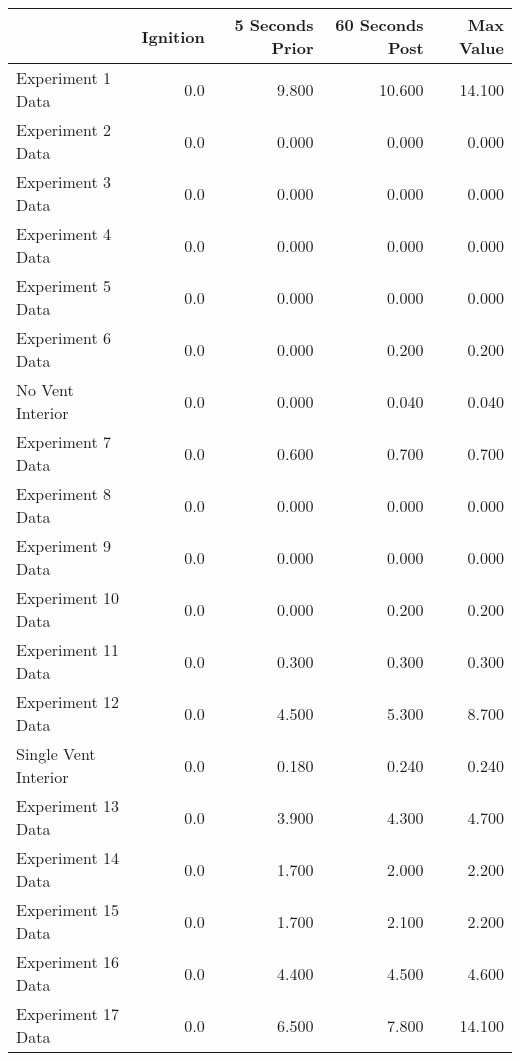 \begin{tabular}{lrrrr}
\toprule
{} &  Ignition &  5 Seconds Prior &  60 Seconds Post &  Max Value \\
\midrule
Experiment 1 Data    &       0.0 &            9.800 &           10.600 &     14.100 \\
Experiment 2 Data    &       0.0 &            0.000 &            0.000 &      0.000 \\
Experiment 3 Data    &       0.0 &            0.000 &            0.000 &      0.000 \\
Experiment 4 Data    &       0.0 &            0.000 &            0.000 &      0.000 \\
Experiment 5 Data    &       0.0 &            0.000 &            0.000 &      0.000 \\
Experiment 6 Data    &       0.0 &            0.000 &            0.200 &      0.200 \\
No Vent Interior     &       0.0 &            0.000 &            0.040 &      0.040 \\
Experiment 7 Data    &       0.0 &            0.600 &            0.700 &      0.700 \\
Experiment 8 Data    &       0.0 &            0.000 &            0.000 &      0.000 \\
Experiment 9 Data    &       0.0 &            0.000 &            0.000 &      0.000 \\
Experiment 10 Data   &       0.0 &            0.000 &            0.200 &      0.200 \\
Experiment 11 Data   &       0.0 &            0.300 &            0.300 &      0.300 \\
Experiment 12 Data   &       0.0 &            4.500 &            5.300 &      8.700 \\
Single Vent Interior &       0.0 &            0.180 &            0.240 &      0.240 \\
Experiment 13 Data   &       0.0 &            3.900 &            4.300 &      4.700 \\
Experiment 14 Data   &       0.0 &            1.700 &            2.000 &      2.200 \\
Experiment 15 Data   &       0.0 &            1.700 &            2.100 &      2.200 \\
Experiment 16 Data   &       0.0 &            4.400 &            4.500 &      4.600 \\
Experiment 17 Data   &       0.0 &            6.500 &            7.800 &     14.100 \\

\end{tabular}
